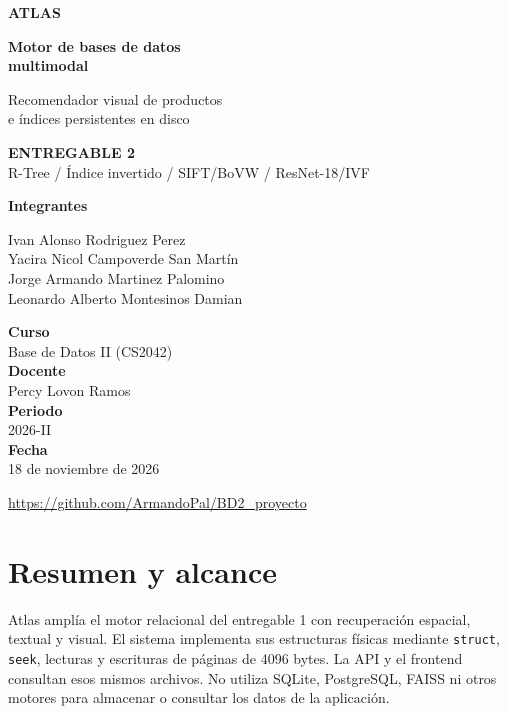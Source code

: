 \documentclass[11pt,a4paper]{article}
\newcommand{\code}[1]{\texttt{#1}}
\begin{document}
\hypersetup{pageanchor=false}
\begin{titlepage}
\vspace*{12mm}
{\color{atlas}\Large\bfseries ATLAS\par}
\vspace{17mm}
{\fontsize{32}{38}\selectfont\bfseries Motor de bases de datos\\multimodal\par}
\vspace{7mm}
{\Large Recomendador visual de productos\\e índices persistentes en disco\par}
\vspace{13mm}
\colorbox{soft}{\parbox{.91\textwidth}{\vspace{5mm}\hspace{4mm}\textcolor{atlas}{\textbf{ENTREGABLE 2}}\\[3mm]\hspace{4mm}R-Tree / Índice invertido / SIFT/BoVW / ResNet-18/IVF\vspace{5mm}}}
\vfill
\begin{center}
{\large\textbf{Integrantes}\par}
\vspace{2mm}
Ivan Alonso Rodriguez Perez\\
Yacira Nicol Campoverde San Martín\\
Jorge Armando Martinez Palomino\\
Leonardo Alberto Montesinos Damian
\vspace{9mm}

\textbf{Curso}\\ Base de Datos II (CS2042)\\[3mm]
\textbf{Docente}\\ Percy Lovon Ramos\\[3mm]
\textbf{Periodo}\\ 2026-II\\[3mm]
\textbf{Fecha}\\ 18 de noviembre de 2026
\vspace{7mm}

{\small\url{https://github.com/ArmandoPal/BD2_proyecto}\par}
\end{center}
\end{titlepage}
\hypersetup{pageanchor=true}
\tableofcontents
\newpage
\section{Resumen y alcance}
Atlas amplía el motor relacional del entregable 1 con recuperación espacial, textual y visual. El sistema implementa sus estructuras físicas mediante \code{struct}, \code{seek}, lecturas y escrituras de páginas de 4096 bytes. La API y el frontend consultan esos mismos archivos. No utiliza SQLite, PostgreSQL, FAISS ni otros motores para almacenar o consultar los datos de la aplicación.
\end{document}
